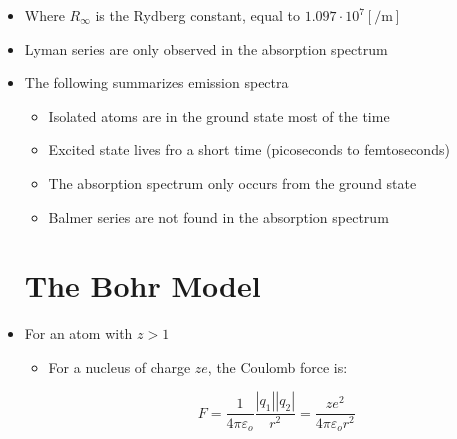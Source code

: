 \begin{itemize}
  \item Where $R_{\infty}$ is the Rydberg constant, equal to $1.097\cdot10^7 [\si{\per\meter}]$

  \item Lyman series are only observed in the absorption spectrum

  \item The following summarizes emission spectra

    \begin{itemize}

      \item Isolated atoms are in the ground state most of the time

      \item Excited state lives fro a short time (picoseconds to femtoseconds)

      \item The absorption spectrum only occurs from the ground state

      \item Balmer series are not found in the absorption spectrum

    \end{itemize}

    \section{The Bohr Model}

  \item For an atom with $z>1$

    \begin{itemize}

      \item For a nucleus of charge $ze$, the Coulomb force is:

        $$F=\frac{1}{4\pi\varepsilon_o}\frac{|q_1||q_2|}{r^2}=\frac{ze^2}{4\pi\varepsilon_o r^2}$$

    \end{itemize}

\end{itemize}



